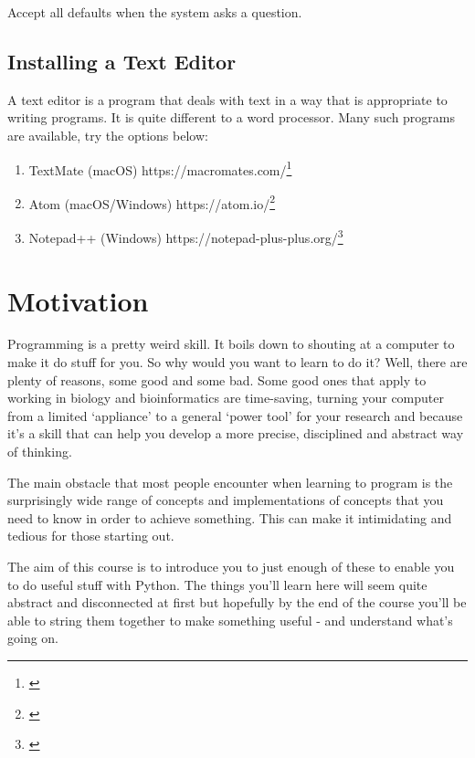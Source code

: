 \documentclass[]{book}
\providecommand{\tightlist}{%
  \setlength{\itemsep}{0pt}\setlength{\parskip}{0pt}}
\let\rmarkdownfootnote\footnote%
\def\footnote{\protect\rmarkdownfootnote}
\renewcommand{\href}[2]{#2\footnote{\url{#1}}}
\theoremstyle{definition}
\theoremstyle{definition}
\theoremstyle{definition}
\theoremstyle{remark}
\begin{document}
Accept all defaults when the system asks a question.

\hypertarget{installing-a-text-editor}{%
\section{Installing a Text Editor}\label{installing-a-text-editor}}

A text editor is a program that deals with text in a way that is
appropriate to writing programs. It is quite different to a word
processor. Many such programs are available, try the options below:

\begin{enumerate}
\def\labelenumi{\arabic{enumi}.}
\tightlist
\item
  TextMate (macOS) \href{}{https://macromates.com/}
\item
  Atom (macOS/Windows) \href{}{https://atom.io/}
\item
  Notepad++ (Windows) \href{}{https://notepad-plus-plus.org/}
\end{enumerate}

\hypertarget{motivation}{%
\chapter{Motivation}\label{motivation}}

Programming is a pretty weird skill. It boils down to shouting at a
computer to make it do stuff for you. So why would you want to learn to
do it? Well, there are plenty of reasons, some good and some bad. Some
good ones that apply to working in biology and bioinformatics are
time-saving, turning your computer from a limited `appliance' to a
general `power tool' for your research and because it's a skill that can
help you develop a more precise, disciplined and abstract way of
thinking.

The main obstacle that most people encounter when learning to program is
the surprisingly wide range of concepts and implementations of concepts
that you need to know in order to achieve something. This can make it
intimidating and tedious for those starting out.

The aim of this course is to introduce you to just enough of these to
enable you to do useful stuff with Python. The things you'll learn here
will seem quite abstract and disconnected at first but hopefully by the
end of the course you'll be able to string them together to make
something useful - and understand what's going on.
\end{document}
